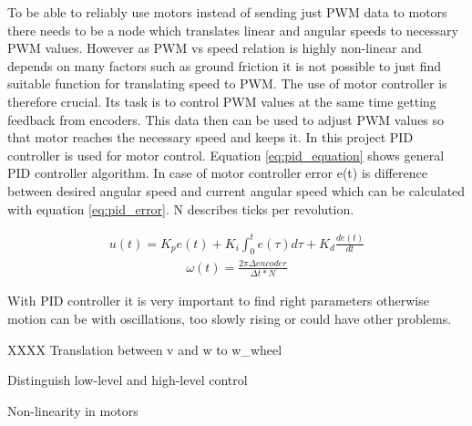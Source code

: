 To be able to reliably use motors instead of sending just PWM data to motors there needs to be a node which translates linear and angular speeds to necessary PWM values. However as PWM vs speed relation is highly non-linear and depends on many factors such as ground friction it is not possible to just find suitable function for translating speed to PWM. The use of motor controller is therefore crucial. Its task is to control PWM values at the same time getting feedback from encoders. This data then can be used to adjust PWM values so that motor reaches the necessary speed and keeps it. In this project PID controller is used for motor control. Equation \ref{eq:pid_equation} shows general PID controller algorithm. In case of motor controller error e(t) is difference between desired angular speed and current angular speed which can be calculated with equation \ref{eq:pid_error}. N describes ticks per revolution.

\begin{align}
\label{eq:pid_equation}
u(t) = K_p e(t) + K_i \int_{0}^{t} e(\tau) d\tau + K_d \frac{de(t)}{dt} 
\end{align}
\begin{align}
\label{eq:pid_error}
\omega (t) = \frac{2 \pi \Delta encoder}{\Delta t * N}
\end{align}

With PID controller it is very important to find right parameters otherwise motion can be with oscillations, too slowly rising or could have other problems. 

XXXX Translation between v and w to w_wheel

Distinguish low-level and high-level control

Non-linearity in motors